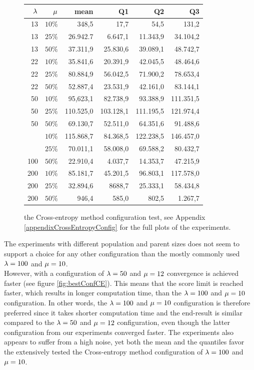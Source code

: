 \begin{figure}[H]
\centering
\begin{tabular}{r r | r r r r}
$\lambda$ & $\mu$ & mean & Q1 & Q2 & Q3\\
\hline
13 & $10\%$  & 348,5      & 17,7      & 54,5         & 131,2\\
13 & $25\%$  & 26.942.7   & 6.647,1   & 11.343,9     & 34.104,2\\
13 & $50\%$  & 37.311,9   & 25.830,6  & 39.089,1     & 48.742,7\\
22 & $10\%$  & 35.841,6   & 20.391,9  & 42.045,5     & 48.464,6\\
22 & $25\%$  & 80.884,9   & 56.042,5  & 71.900,2     & 78.653,4\\
22 & $50\%$  & 52.887,4   & 23.531,9  & 42.161,0     & 83.144,1\\
50 & $10\%$  & 95,623,1   & 82.738,9  & 93.388,9     & 111.351,5\\
50 & $25\%$  & 110.525,0  & 103.128,1 & 111.195,5    & 121.974,4\\
50 & $50\%$  & 69.130,7   & 52.511,0  & 64.351,6     & 91.488,6\\
\hdashline
100 & $10\%$ & 115.868,7  & 84.368,5  & 122.238,5    & 146.457,0\\
\hdashline
100 & $25\%$ & 70.011,1   & 58.008,0  & 69.588,2     & 80.432,7\\
100 & $50\%$ & 22.910,4   & 4.037,7   & 14.353,7     & 47.215,9\\
200 & $10\%$ & 85.181,7   & 45.201,5  & 96.803,1     & 117.578,0\\
200 & $25\%$ & 32.894,6   & 8688,7    & 25.333,1     & 58.434,8\\
200 & $50\%$ & 946,4      & 585,0     & 802,5        & 1.267,7
\end{tabular}
\caption{the Cross-entropy method configuration test, 
see Appendix \ref{appendixCrossEntropyConfig} for the full plots 
of the experiments.  \label{CEConfigTest}}
\end{figure}

The experiments with different population and parent sizes
does not seem to support a choice for any other configuration 
than the mostly commonly used 
$\lambda = 100$ and $\mu = 10$. \\
However, with a configuration of $\lambda = 50$ and $\mu = 12$ convergence
is achieved faster (see figure \ref{fig:bestConfCE}). This means that the score limit is reached faster, which
results in longer computation time, than the $\lambda = 100$ and $\mu = 10$
configuration. In other words, the $\lambda = 100$ and $\mu = 10$ configuration 
is therefore preferred since it takes shorter computation time and the end-result is similar compared
to the $\lambda = 50$ and $\mu = 12$ configuration, even though the latter 
configuration from our experiments converged faster. The experiments also appears
to suffer from a high noise, yet both the mean and the quantiles favor the 
extensively tested the Cross-entropy method configuration of $\lambda = 100$ and $\mu = 10$.

